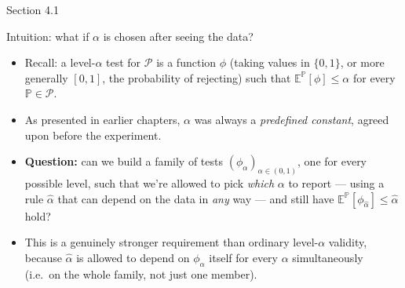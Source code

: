 \documentclass[aspectratio=169,10pt]{beamer}
\begin{document}
\begin{frame}{Section 4.1}
  \tableofcontents[currentsection]
\end{frame}

\begin{frame}{Intuition: what if $\alpha$ is chosen after seeing the data?}
  \begin{itemize}
    \item Recall: a level-$\alpha$ test for $\mathcal P$ is a function
    $\phi$ (taking values in $\{0,1\}$, or more generally $[0,1]$, the
    probability of rejecting) such that $\mathbb E^{\mathbb P}[\phi]\le\alpha$
    for every $\mathbb P\in\mathcal P$.
    \item As presented in earlier chapters, $\alpha$ was always a
    \emph{predefined constant}, agreed upon before the experiment.
    \item \textbf{Question:} can we build a family of tests
    $(\phi_\alpha)_{\alpha\in(0,1)}$, one for every possible level, such that
    we're allowed to pick \emph{which} $\alpha$ to report --- using a rule
    $\hat\alpha$ that can depend on the data in \emph{any} way --- and still
    have $\mathbb E^{\mathbb P}[\phi_{\hat\alpha}]\le\hat\alpha$ hold?
    \item This is a genuinely stronger requirement than ordinary level-$\alpha$
    validity, because $\hat\alpha$ is allowed to depend on $\phi_\alpha$ itself
    for every $\alpha$ simultaneously (i.e.\ on the whole family, not just one
    member).
  \end{itemize}
\end{frame}
\end{document}
